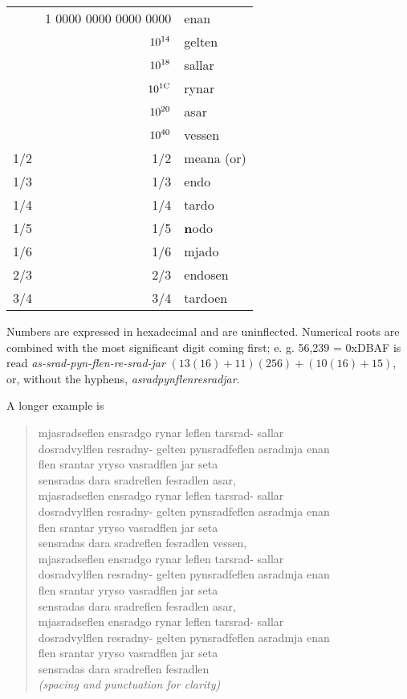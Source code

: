 \documentclass{book}
\begin{document}
\begin{center}
\begin{longtable}{|r|r|l|}
    & 1 0000 0000 0000 0000 & enan \\
    & $\textmd{10}^{\textmd{14}}$ & gelten \\
    & $\textmd{10}^{\textmd{18}}$ & sallar \\
    & $\textmd{10}^{\textmd{1C}}$ & rynar \\
    & $\textmd{10}^{\textmd{20}}$ & asar \\
    & $\textmd{10}^{\textmd{40}}$ & vessen \\
    \hline
    \hline
    1/2 & 1/2 & meana (or) \\
    1/3 & 1/3 & endo \\
    1/4 & 1/4 & tardo \\
    1/5 & 1/5 & \textbf{n}odo \\
    1/6 & 1/6 & mjado \\
    2/3 & 2/3 & endosen \\
    3/4 & 3/4 & tardoen \\
    \hline
  \end{longtable}
\end{center}

Numbers are expressed in hexadecimal and are uninflected. Numerical roots are combined with the most significant digit coming first; e. g. 56,239 = 0xDBAF is read \emph{as-srad-pyn-flen-re-srad-jar} $(13(16) + 11)(256) + (10(16) + 15)$, or, without the hyphens, \emph{asradpynflenresradjar}.

A longer example is

\begin{quote}
	mjasradseflen ensradgo rynar leflen tarsrad- sallar \\
	dosradvylflen resradny- gelten pynsradfeflen asradmja enan \\
	flen srantar yryso vasradflen jar seta \\
	sensradas dara sradreflen fesradlen asar, \\
	mjasradseflen ensradgo rynar leflen tarsrad- sallar \\
	dosradvylflen resradny- gelten pynsradfeflen asradmja enan \\
	flen srantar yryso vasradflen jar seta \\
	sensradas dara sradreflen fesradlen vessen, \\
	mjasradseflen ensradgo rynar leflen tarsrad- sallar \\
	dosradvylflen resradny- gelten pynsradfeflen asradmja enan \\
	flen srantar yryso vasradflen jar seta \\
	sensradas dara sradreflen fesradlen asar, \\
	mjasradseflen ensradgo rynar leflen tarsrad- sallar \\
	dosradvylflen resradny- gelten pynsradfeflen asradmja enan \\
	flen srantar yryso vasradflen jar seta \\
	sensradas dara sradreflen fesradlen \\
	\emph{(spacing and punctuation for clarity)}
\end{quote}
\end{document}
